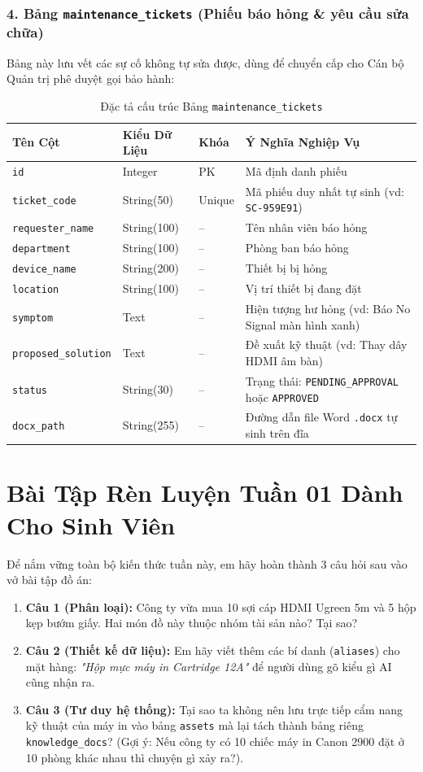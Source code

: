 \documentclass[11pt,a4paper]{article}
\begin{document}
\subsubsection{4. Bảng \texttt{maintenance\_tickets} (Phiếu báo hỏng \& yêu cầu sửa chữa)}
Bảng này lưu vết các sự cố không tự sửa được, dùng để chuyển cấp cho Cán bộ Quản trị phê duyệt gọi bảo hành:
\begin{table}[H]
\centering
\small
\begin{tabularx}{\textwidth}{l l l X}
\toprule
\textbf{Tên Cột} & \textbf{Kiểu Dữ Liệu} & \textbf{Khóa} & \textbf{Ý Nghĩa Nghiệp Vụ} \\
\midrule
\texttt{id} & Integer & PK & Mã định danh phiếu \\
\texttt{ticket\_code} & String(50) & Unique & Mã phiếu duy nhất tự sinh (vd: \texttt{SC-959E91}) \\
\texttt{requester\_name} & String(100) & -- & Tên nhân viên báo hỏng \\
\texttt{department} & String(100) & -- & Phòng ban báo hỏng \\
\texttt{device\_name} & String(200) & -- & Thiết bị bị hỏng \\
\texttt{location} & String(100) & -- & Vị trí thiết bị đang đặt \\
\texttt{symptom} & Text & -- & Hiện tượng hư hỏng (vd: Báo No Signal màn hình xanh) \\
\texttt{proposed\_solution} & Text & -- & Đề xuất kỹ thuật (vd: Thay dây HDMI âm bàn) \\
\texttt{status} & String(30) & -- & Trạng thái: \texttt{PENDING\_APPROVAL} hoặc \texttt{APPROVED} \\
\texttt{docx\_path} & String(255) & -- & Đường dẫn file Word \texttt{.docx} tự sinh trên đĩa \\
\bottomrule
\end{tabularx}
\caption{Đặc tả cấu trúc Bảng \texttt{maintenance\_tickets}}
\end{table}

\section{Bài Tập Rèn Luyện Tuần 01 Dành Cho Sinh Viên}

Để nắm vững toàn bộ kiến thức tuần này, em hãy hoàn thành 3 câu hỏi sau vào vở bài tập đồ án:

\begin{enumerate}
    \item \textbf{Câu 1 (Phân loại):} Công ty vừa mua 10 sợi cáp HDMI Ugreen 5m và 5 hộp kẹp bướm giấy. Hai món đồ này thuộc nhóm tài sản nào? Tại sao?
    \item \textbf{Câu 2 (Thiết kế dữ liệu):} Em hãy viết thêm các bí danh (\texttt{aliases}) cho mặt hàng: \textit{"Hộp mực máy in Cartridge 12A"} để người dùng gõ kiểu gì AI cũng nhận ra.
    \item \textbf{Câu 3 (Tư duy hệ thống):} Tại sao ta không nên lưu trực tiếp cẩm nang kỹ thuật của máy in vào bảng \texttt{assets} mà lại tách thành bảng riêng \texttt{knowledge\_docs}? (Gợi ý: Nếu công ty có 10 chiếc máy in Canon 2900 đặt ở 10 phòng khác nhau thì chuyện gì xảy ra?).
\end{enumerate}
\end{document}
